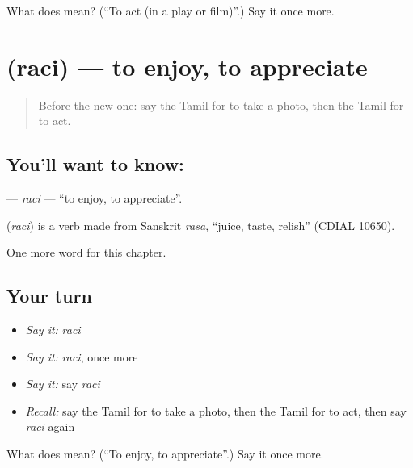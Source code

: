 \begin{tcolorbox}[breakable,colback=teal!4,colframe=teal!35!black,title={Before you move on}]
What does  mean? (\textquotedblleft{}To act (in a play or film)\textquotedblright{}.) Say it once more.
\end{tcolorbox}
\section[\texorpdfstring{\ta{ரசி} (raci)}{ரசி (raci)}]{ (raci) — to enjoy, to appreciate}

\label{lesson:TA-C259-raci}



\begin{quote}
Before the new one: say the Tamil for to take a photo, then the Tamil for to act.
\end{quote}

\subsection*{You'll want to know: }
\textbf{} — \emph{raci} — \textquotedblleft{}to enjoy, to appreciate\textquotedblright{}.

\begin{cousinweb}
\textbf{} (\emph{raci}) is a verb made from Sanskrit \emph{rasa}, \textquotedblleft{}juice, taste, relish\textquotedblright{} (CDIAL 10650).
\end{cousinweb}

\begin{grammarlens}[title={What you've built}]
One more word for this chapter.
\end{grammarlens}

\subsection*{Your turn}
\begin{itemize}
\raggedright
  \item \emph{Say it:} \emph{raci}
  \item \emph{Say it:} \emph{raci}, once more
  \item \emph{Say it:} say \emph{raci}
  \item \emph{Recall:} say the Tamil for to take a photo, then the Tamil for to act, then say \emph{raci} again
\end{itemize}

\begin{tcolorbox}[breakable,colback=teal!4,colframe=teal!35!black,title={Before you move on}]
What does  mean? (\textquotedblleft{}To enjoy, to appreciate\textquotedblright{}.) Say it once more.
\end{tcolorbox}
